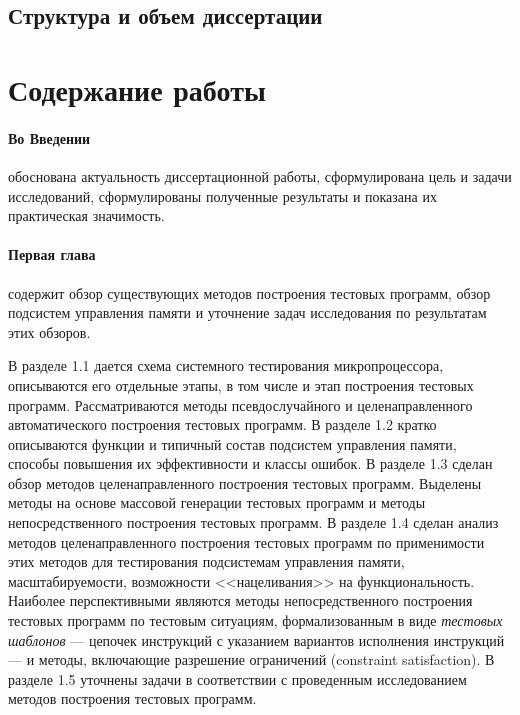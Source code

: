 \documentclass[14pt,autoref,href
,facsimile
]{disser}
\begin{document}

\subsection*{Структура и объем диссертации}
\Structure


%
%


\section*{Содержание работы}

\paragraph{Во Введении} обоснована актуальность диссертационной работы,
сформулирована цель и задачи исследований, сформулированы полученные результаты и показана их
практическая значимость.

%
%


\paragraph{Первая глава} содержит обзор существующих методов построения тестовых программ, обзор подсистем управления памяти и уточнение задач исследования по результатам этих обзоров.

В разделе 1.1 дается схема системного тестирования микропроцессора, описываются его отдельные этапы, в том числе и этап построения тестовых программ. Рассматриваются методы псевдослучайного и целенаправленного автоматического построения тестовых программ. В разделе 1.2 кратко описываются функции и типичный состав подсистем управления памяти, способы повышения их эффективности и классы ошибок. В разделе 1.3 сделан обзор методов целенаправленного построения тестовых программ. Выделены методы на основе массовой генерации тестовых программ и методы непосредственного построения тестовых программ. В разделе 1.4 сделан анализ методов целенаправленного построения тестовых программ по применимости этих методов для тестирования подсистемам управления памяти, масштабируемости, возможности <<нацеливания>> на функциональность. Наиболее перспективными являются методы непосредственного построения тестовых программ по тестовым ситуациям, формализованным в виде \emph{тестовых шаблонов} --- цепочек инструкций с указанием вариантов исполнения инструкций --- и методы, включающие разрешение ограничений (constraint satisfaction). В разделе 1.5 уточнены задачи в соответствии с проведенным исследованием методов построения тестовых программ.
\end{document}
